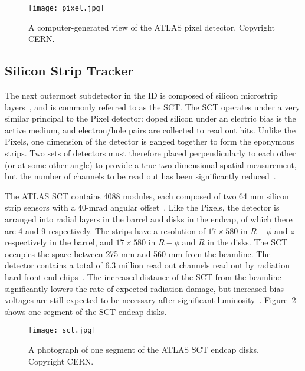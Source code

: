 
\begin{figure}
\centering
\texttt{[image: pixel.jpg]}
\label{fig:detector:pixel}
\caption{A computer-generated view of the ATLAS pixel detector. Copyright CERN.}
\end{figure}




\subsection{Silicon Strip Tracker}

The next outermost subdetector in the ID is composed of silicon microstrip layers~\cite{SCTPaper,ATLASPaper}, and is commonly referred to as the SCT.  The SCT operates under a very similar principal to the Pixel detector: doped silicon under an electric bias is the active medium, and electron/hole pairs are collected to read out hits. Unlike the Pixels, one dimension of the detector is ganged together to form the eponymous strips. Two sets of detectors must therefore placed perpendicularly to each other (or at some other angle) to provide a true two-dimensional spatial measurement, but the number of channels to be read out has been significantly reduced~\cite{Detectors}.

The ATLAS SCT contains 4088 modules, each composed of two 64 mm silicon strip sensors with a 40-mrad angular offset~\cite{ATLASPaper}. Like the Pixels, the detector is arranged into radial layers in the barrel and disks in the endcap, of which there are 4 and 9 respectively. The strips have a resolution of $17 \times 580$ in $R-\phi$ and $z$ respectively in the barrel, and $17 \times 580$ in $R-\phi$ and $R$ in the disks. The SCT occupies the space between 275 mm and 560 mm from the beamline. The detector contains a total of 6.3 million read out channels read out by radiation hard front-end chips~\cite{SCTReadout}. The increased distance of the SCT from the beamline significantly lowers the rate of expected radiation damage, but increased bias voltages are still expected to be necessary after significant luminosity~\cite{SCTPaper,ATLASPaper}.  Figure~\ref{fig:detector:sct} shows one segment of the SCT endcap disks.



\begin{figure}
\centering
\texttt{[image: sct.jpg]}
\label{fig:detector:sct}
\caption{A photograph of one segment of the ATLAS SCT endcap disks. Copyright CERN.}
\end{figure}

